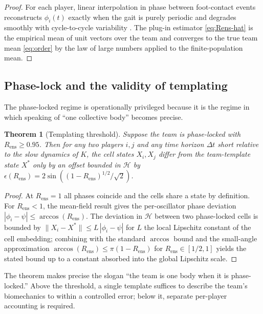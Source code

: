 \documentclass[11pt,twocolumn,a4paper]{article}
\newtheorem{theorem}{Theorem}[section]
\theoremstyle{definition}
\theoremstyle{remark}
\newcommand{\Rens}{R_{\mathrm{ens}}}
\newcommand{\Hcal}{\mathcal{H}}
\begin{document}
\begin{proof}
For each player, linear interpolation in phase between foot-contact
events reconstructs $\phi_i(t)$ exactly when the gait is purely periodic
and degrades smoothly with cycle-to-cycle variability \citep{winter2009}.
The plug-in estimator \eqref{eq:Rens-hat} is the empirical mean of unit
vectors over the team and converges to the true team mean
\eqref{eq:order} by the law of large numbers applied to the
finite-population mean.
\end{proof}

\subsection{Phase-lock and the validity of templating}

The phase-locked regime is operationally privileged because it is the
regime in which speaking of ``one collective body'' becomes precise.

\begin{theorem}[Templating threshold]
\label{thm:template}
Suppose the team is phase-locked with $\Rens \geq 0.95$. Then for any
two players $i, j$ and any time horizon $\Delta t$ short relative to
the slow dynamics of $K$, the cell states $X_i, X_j$ differ from the
team-template state $X^{*}$ only by an offset bounded in $\Hcal$ by
$\epsilon(\Rens) = 2\sin\!\left((1-\Rens)^{1/2}/\sqrt{2}\right)$.
\end{theorem}

\begin{proof}
At $\Rens = 1$ all phases coincide and the cells share a state by
definition. For $\Rens < 1$, the mean-field result \citep{strogatz2000}
gives the per-oscillator phase deviation
$|\phi_i - \psi| \leq \arccos(\Rens)$. The deviation in $\Hcal$
between two phase-locked cells is bounded by
$\|X_i - X^{*}\| \leq L\,|\phi_i - \psi|$ for $L$ the local
Lipschitz constant of the cell embedding; combining with the standard
$\arccos$ bound and the small-angle approximation
$\arccos(\Rens) \leq \pi(1-\Rens)$ for $\Rens \in [1/2,1]$ yields the
stated bound up to a constant absorbed into the global Lipschitz scale.
\end{proof}

The theorem makes precise the slogan ``the team is one body when it is
phase-locked.'' Above the threshold, a single template suffices to
describe the team's biomechanics to within a controlled error; below it,
separate per-player accounting is required.
\end{document}
